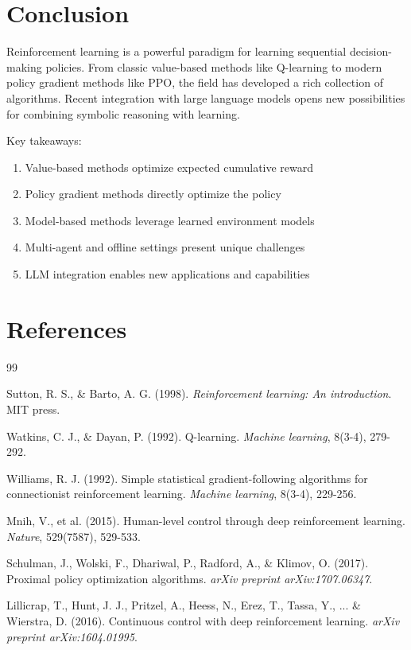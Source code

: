 \documentclass[10pt]{article}
\begin{document}
\section{Conclusion}

Reinforcement learning is a powerful paradigm for learning sequential decision-making policies. From classic value-based methods like Q-learning to modern policy gradient methods like PPO, the field has developed a rich collection of algorithms. Recent integration with large language models opens new possibilities for combining symbolic reasoning with learning.

Key takeaways:
\begin{enumerate}
    \item Value-based methods optimize expected cumulative reward
    \item Policy gradient methods directly optimize the policy
    \item Model-based methods leverage learned environment models
    \item Multi-agent and offline settings present unique challenges
    \item LLM integration enables new applications and capabilities
\end{enumerate}

\section*{References}

\cite{Sutton1998}
\cite{Watkins1992}
\cite{Williams1992}
\cite{Mnih2015}
\cite{Schulman2017}
\cite{Lillicrap2016}

\begin{thebibliography}{99}

Sutton, R. S., \& Barto, A. G. (1998).
\textit{Reinforcement learning: An introduction}.
MIT press.

Watkins, C. J., \& Dayan, P. (1992).
Q-learning.
\textit{Machine learning}, 8(3-4), 279-292.

Williams, R. J. (1992).
Simple statistical gradient-following algorithms for connectionist reinforcement learning.
\textit{Machine learning}, 8(3-4), 229-256.

Mnih, V., et al. (2015).
Human-level control through deep reinforcement learning.
\textit{Nature}, 529(7587), 529-533.

Schulman, J., Wolski, F., Dhariwal, P., Radford, A., \& Klimov, O. (2017).
Proximal policy optimization algorithms.
\textit{arXiv preprint arXiv:1707.06347}.

Lillicrap, T., Hunt, J. J., Pritzel, A., Heess, N., Erez, T., Tassa, Y., ... \& Wierstra, D. (2016).
Continuous control with deep reinforcement learning.
\textit{arXiv preprint arXiv:1604.01995}.

\end{thebibliography}
\end{document}
